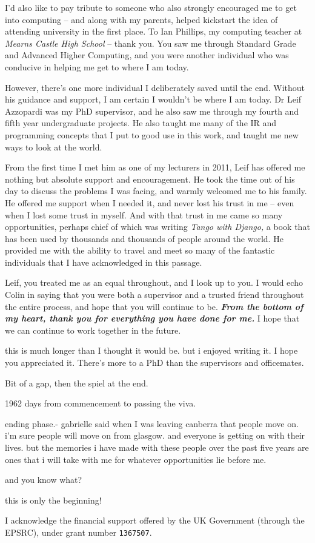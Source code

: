 \begin{preamble}
I'd also like to pay tribute to someone who also strongly encouraged me to get into computing -- and along with my parents, helped kickstart the idea of attending university in the first place. To Ian Phillips, my computing teacher at \emph{Mearns Castle High School} -- thank you. You saw me through Standard Grade and Advanced Higher Computing, and you were another individual who was conducive in helping me get to where I am today.

However, there's one more individual I deliberately saved until the end. Without his guidance and support, I am certain I wouldn't be where I am today. Dr Leif Azzopardi was my PhD supervisor, and he also saw me through my fourth and fifth year undergraduate projects. He also taught me many of the IR and programming concepts that I put to good use in this work, and taught me new ways to look at the world.

From the first time I met him as one of my lecturers in 2011, Leif has offered me nothing but absolute support and encouragement. He took the time out of his day to discuss the problems I was facing, and warmly welcomed me to his family. He offered me support when I needed it, and never lost his trust in me -- even when I lost some trust in myself. And with that trust in me came so many opportunities, perhaps chief of which was writing \emph{Tango with Django,} a book that has been used by thousands and thousands of people around the world. He provided me with the ability to travel and meet so many of the fantastic individuals that I have acknowledged in this passage.

Leif, you treated me as an equal throughout, and I look up to you. I would echo Colin in saying that you were both a supervisor and a trusted friend throughout the entire process, and hope that you will continue to be. \textbf{\emph{From the bottom of my heart, thank you for everything you have done for me.}} I hope that we can continue to work together in the future.

\acksep

this is much longer than I thought it would be.
but i enjoyed writing it. I hope you appreciated it.
There's more to a PhD than the supervisors and officemates.


Bit of a gap, then the spiel at the end.

1962 days from commencement to passing the viva.

ending phase.- gabrielle said when I was leaving canberra that people move on.
i'm sure people will move on from glasgow. and everyone is getting on with their lives.
but the memories i have made with these people over the past five years are ones that i will take with me for whatever opportunities lie before me.

and you know what?

this is only the beginning!

I acknowledge the financial support offered by the UK Government (through the EPSRC), under grant number \texttt{1367507}.

\end{preamble}